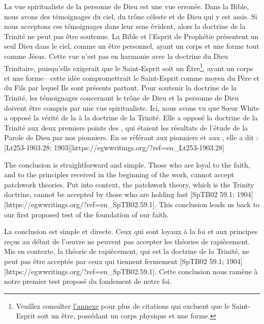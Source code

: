 La vue spiritualiste de la personne de Dieu est une vue erronée. Dans la Bible, nous avons des témoignages du ciel, du trône céleste et de Dieu qui y est assis. Si nous acceptons ces témoignages dans leur sens évident, alors la doctrine de la Trinité ne peut pas être soutenue. La Bible et l'Esprit de Prophétie présentent un seul Dieu dans le ciel, comme un être personnel, ayant un corps et une forme tout comme Jésus. Cette vue n'est pas en harmonie avec la doctrine du Dieu Trinitaire, puisqu'elle exigerait que le Saint-Esprit soit un Être\footnote{Veuillez consulter \hyperref[appendix:unauthenticated-reports]{l'annexe} pour plus de citations qui excluent que le Saint-Esprit soit un être, possédant un corps physique et une forme.}, ayant un corps et une forme—cette idée compromettrait le Saint-Esprit comme moyen du Père et du Fils par lequel Ils sont présents partout. Pour soutenir la doctrine de la Trinité, les témoignages concernant le trône de Dieu et la personne de Dieu doivent être compris par une vue spiritualiste. Ici, nous avons vu que Sœur White a opposé la vérité de la  à la doctrine de la Trinité. Elle a opposé la doctrine de la Trinité aux deux premiers points des , qui étaient les résultats de l'étude de la Parole de Dieu par nos pionniers. En se référant aux pionniers et aux , elle a dit : [Lt253-1903.28; 1903][https://egwwritings.org/?ref=en\_Lt253-1903.28]


The conclusion is straightforward and simple. Those who are loyal to the faith, and to the principles received in the beginning of the work, cannot accept patchwork theories. Put into context, the patchwork theory, which is the Trinity doctrine, cannot be accepted by those who are holding fast [SpTB02 59.1; 1904][https://egwwritings.org/?ref=en\_SpTB02.59.1]. This conclusion leads us back to our first proposed test of the foundation of our faith.


La conclusion est simple et directe. Ceux qui sont loyaux à la foi et aux principes reçus au début de l'œuvre ne peuvent pas accepter les théories de rapiècement. Mis en contexte, la théorie de rapiècement, qui est la doctrine de la Trinité, ne peut pas être acceptée par ceux qui tiennent fermement [SpTB02 59.1; 1904][https://egwwritings.org/?ref=en\_SpTB02.59.1]. Cette conclusion nous ramène à notre premier test proposé du fondement de notre foi.
